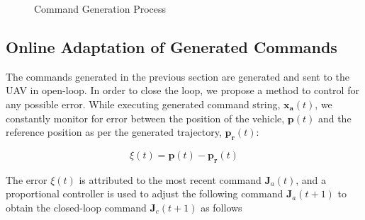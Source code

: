 \documentclass[letterpaper, 10 pt, conference]{ieeeconf}  %
\begin{document}
\begin{figure}[h]
	\centering
	\caption{Command Generation Process}
	\label{fig:gensample}
\end{figure}

\subsection{Online Adaptation of Generated Commands} \label{sec:adapt}

The commands generated in the previous section are generated and sent to the UAV in open-loop. In order to close the loop, we propose a method to control for any possible error. While executing generated command string, $\mathbf{x_a}(t)$, we constantly monitor for error between the position of the vehicle, $\mathbf{p}(t)$ and the reference position as per the generated trajectory, $\mathbf{p_r}(t)$:

\begin{equation}
    \xi(t) = \mathbf{p}(t)-\mathbf{p_r}(t)
\end{equation}

The error $\xi(t)$ is attributed to the most recent command $\mathbf{J}_a(t)$, and a proportional controller is used to adjust the following command $\mathbf{J}_a(t+1)$ to obtain the closed-loop command $\mathbf{J}_c(t+1)$ as follows
\end{document}
